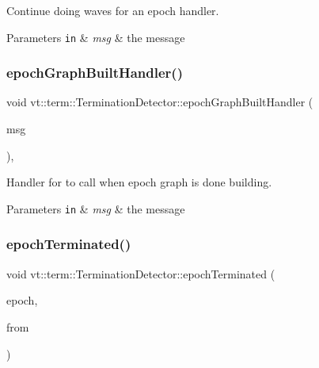 Continue doing waves for an epoch handler. 


\begin{DoxyParams}[1]{Parameters}
\mbox{\tt in}  & {\em msg} & the message \\
\hline
\end{DoxyParams}
\mbox{\label{structvt_1_1term_1_1_termination_detector_a5a8084f2dc7df36da7e78d088ae8cae9}} 
\subsubsection{\texorpdfstring{epoch\+Graph\+Built\+Handler()}{epochGraphBuiltHandler()}}
{\footnotesize\ttfamily void vt\+::term\+::\+Termination\+Detector\+::epoch\+Graph\+Built\+Handler (\begin{DoxyParamCaption}\item[{\hyperlink{structvt_1_1term_1_1_termination_detector_aec8abc5a3b161ac7df73ff3ba385dace}{Epoch\+Graph\+Msg} $\ast$}]{msg }\end{DoxyParamCaption})\hspace{0.3cm}{\ttfamily [static]}, {\ttfamily [private]}}



Handler for to call when epoch graph is done building. 


\begin{DoxyParams}[1]{Parameters}
\mbox{\tt in}  & {\em msg} & the message \\
\hline
\end{DoxyParams}
\mbox{\label{structvt_1_1term_1_1_termination_detector_a54a16b81d1c0717a4a7cd1adff5b146e}} 
\subsubsection{\texorpdfstring{epoch\+Terminated()}{epochTerminated()}}
{\footnotesize\ttfamily void vt\+::term\+::\+Termination\+Detector\+::epoch\+Terminated (\begin{DoxyParamCaption}\item[{\hyperlink{namespacevt_a985a5adf291c34a3ca263b3378388236}{Epoch\+Type} const \&}]{epoch,  }\item[{\hyperlink{structvt_1_1term_1_1_termination_detector_a4f3ede9a87f39d86e85f92b36a6c6a30}{Call\+From\+Enum}}]{from }\end{DoxyParamCaption})\hspace{0.3cm}{\ttfamily [private]}}



